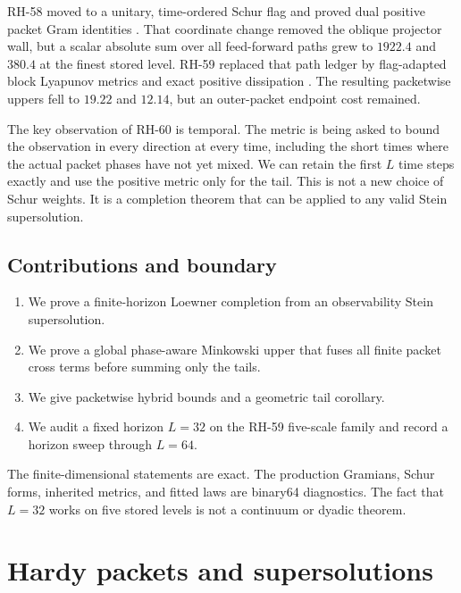 \documentclass[11pt]{article}
\theoremstyle{remark}
\begin{document}
RH-58 moved to a unitary, time-ordered Schur flag and proved dual positive
packet Gram identities \citep{WangSchurGram2026}.  That coordinate change
removed the oblique projector wall, but a scalar absolute sum over all
feed-forward paths grew to $1922.4$ and $380.4$ at the finest stored level.
RH-59 replaced that path ledger by flag-adapted block Lyapunov metrics and
exact positive dissipation \citep{WangFlagMetric2026}.  The resulting
packetwise uppers fell to $19.22$ and $12.14$, but an outer-packet endpoint
cost remained.

The key observation of RH-60 is temporal.  The metric is being asked to
bound the observation in every direction at every time, including the short
times where the actual packet phases have not yet mixed.  We can retain the
first $L$ time steps exactly and use the positive metric only for the tail.
This is not a new choice of Schur weights.  It is a completion theorem that
can be applied to any valid Stein supersolution.

\subsection*{Contributions and boundary}

\begin{enumerate}[leftmargin=2.2em]
 \item We prove a finite-horizon Loewner completion from an observability
       Stein supersolution.
 \item We prove a global phase-aware Minkowski upper that fuses all finite
       packet cross terms before summing only the tails.
 \item We give packetwise hybrid bounds and a geometric tail corollary.
 \item We audit a fixed horizon $L=32$ on the RH-59 five-scale family and
       record a horizon sweep through $L=64$.
\end{enumerate}

The finite-dimensional statements are exact.  The production Gramians,
Schur forms, inherited metrics, and fitted laws are binary64 diagnostics.
The fact that $L=32$ works on five stored levels is not a continuum or
dyadic theorem.

\section{Hardy packets and supersolutions}
\label{sec:setup}
\end{document}
